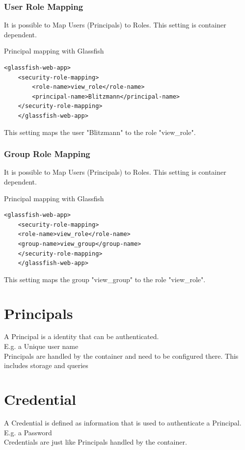 \documentclass[12pt,a4paper]{report}
\begin{document}
\subsubsection{User Role Mapping}
It is possible to Map Users (Principals) to Roles. This setting is container dependent.\\
\begin{bclogo}[couleur=yellow!15,arrondi=0.1,logo=\bccrayon, ombre = true]{Principal mapping with Glassfish}
	\begin{lstlisting}[style=XML]
	<glassfish-web-app>
	<security-role-mapping>
		<role-name>view_role</role-name>
		<principal-name>Blitzmann</principal-name>
	</security-role-mapping>
	</glassfish-web-app>
	\end{lstlisting}
\end{bclogo}
This setting maps the user "Blitzmann" to the role "view\_role".
\newpage
\subsubsection{Group Role Mapping}
It is possible to Map Users (Principals) to Roles. This setting is container dependent.\\
\begin{bclogo}[couleur=yellow!15,arrondi=0.1,logo=\bccrayon, ombre = true]{Principal mapping with Glassfish}
	\begin{lstlisting}[style=XML]
	<glassfish-web-app>
	<security-role-mapping>
	<role-name>view_role</role-name>
	<group-name>view_group</group-name>
	</security-role-mapping>
	</glassfish-web-app>
	\end{lstlisting}
\end{bclogo}
This setting maps the group "view\_group" to the role "view\_role".
\section{Principals}
A Principal is a identity that can be authenticated.\\
E.g. a Unique user name\\
Principals are handled by the container and need to be configured there. This includes storage and queries\\

\section{Credential}
A Credential is defined as information that is used to authenticate a Principal.\\
E.g. a Password\\
Credentials are just like Principals handled by the container.
\end{document}
